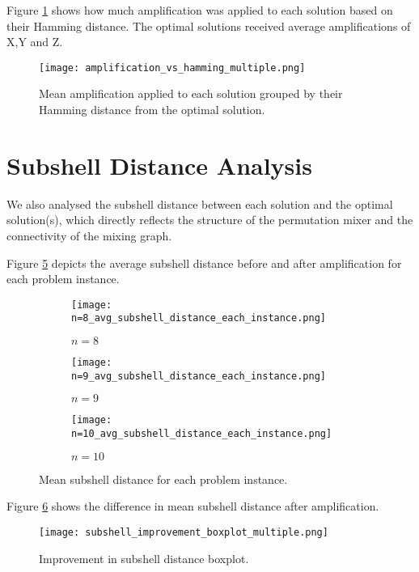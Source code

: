 Figure \ref{fig:amp vs ham} shows how much amplification was applied to each solution based on their Hamming distance. The optimal solutions received average amplifications of X,Y and Z.
\begin{figure}[htbp]
    \centering
    \texttt{[image: amplification\_vs\_hamming\_multiple.png]}
    \caption{Mean amplification applied to each solution grouped by their Hamming distance from the optimal solution.}
    \label{fig:amp vs ham}
\end{figure}

\section{Subshell Distance Analysis}
We also analysed the subshell distance between each solution and the optimal solution(s), which directly reflects the structure of the permutation mixer and the connectivity of the mixing graph.

Figure \ref{fig:avg sub} depicts the average subshell distance before and after amplification for each problem instance.
\begin{figure}[htbp]
     \centering
     \begin{subfigure}{0.45\textwidth}
         \centering
         \texttt{[image: n=8\_avg\_subshell\_distance\_each\_instance.png]}
         \caption{$n=8$}
         \label{fig:avg sub 8}
     \end{subfigure}
     \hfill
     \begin{subfigure}{0.45\textwidth}
         \centering
         \texttt{[image: n=9\_avg\_subshell\_distance\_each\_instance.png]}
         \caption{$n=9$}
         \label{fig:avg sub 9}
     \end{subfigure}
     \hfill
     \begin{subfigure}{\textwidth}
         \centering
         \texttt{[image: n=10\_avg\_subshell\_distance\_each\_instance.png]}
         \caption{$n=10$}
         \label{fig:avg sub 10}
     \end{subfigure}
        \caption{Mean subshell distance for each problem instance.}
        \label{fig:avg sub}
\end{figure}

Figure \ref{fig:sub improvement} shows the difference in mean subshell distance after amplification.
\begin{figure}[htbp]
    \centering
    \texttt{[image: subshell\_improvement\_boxplot\_multiple.png]}
    \caption{Improvement in subshell distance boxplot.}
    \label{fig:sub improvement}
\end{figure}

